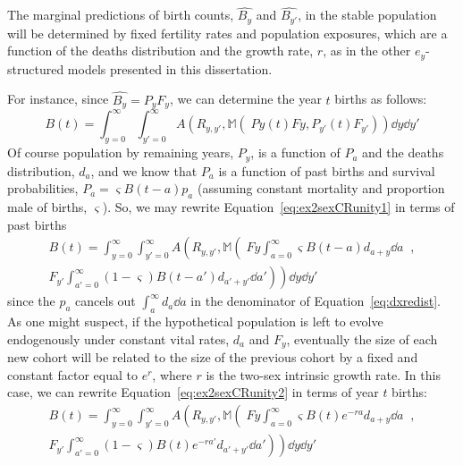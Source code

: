 The marginal predictions of birth counts, $\widehat{B_y}$ and
$\widehat{B_{y'}}$, in the stable population will be determined by
fixed fertility rates and population exposures, which are a function of the
deaths distribution and the growth rate, $r$, as in the other $e_y$-structured 
models presented in this dissertation. 

For instance, since $\widehat{B_y} = P_yF_y$, we can determine the year $t$
births as follows:
\begin{equation}
\label{eq:ex2sexCRunity1}
B(t) = \int_{y=0}^\infty \int_{y'=0}^\infty
A\left(R_{y,y'},\mathbb{M}\left(\;Py(t)Fy, P_{y'}(t)F_{y'} \right)\right) \dd y
\dd y'
\end{equation} 
Of course population by remaining years, $P_y$, is a function of $P_a$ and the
deaths distribution, $d_a$, and we know that $P_a$ is a function of past births
and survival probabilities, $P_a = \varsigma B(t-a)p_a$ (assuming constant
mortality and proportion male of births, $\varsigma$). So, we may rewrite
Equation~\eqref{eq:ex2sexCRunity1} in terms of past births
\begin{equation}
\label{eq:ex2sexCRunity2}
\begin{split}
B(t) = \int_{y=0}^\infty \int_{y'=0}^\infty
A\left(R_{y,y'},\mathbb{M}\left(\;Fy \int_{a=0}^\infty\varsigma
B(t-a)d_{a+y}\dd a\;\;,\right. \right. \\\left.
\left.F_{y'}\int_{a'=0}^\infty(1-\varsigma) B(t-a')d_{a'+y'} \dd a'\right)\right) \dd y \dd y'
\end{split}
\end{equation}
since the $p_a$ cancels out $\int _a^\infty d_a \dd a$ in the denominator of
Equation~\eqref{eq:dxredist}. As one might suspect, if the hypothetical
population is left to evolve endogenously under constant vital rates, $d_a$
and $F_y$, eventually the size of each new cohort will be related to the size
of the previous cohort by a fixed and constant factor equal to $e^r$, where
$r$ is the two-sex intrinsic growth rate. In this case, we can rewrite
Equation~\eqref{eq:ex2sexCRunity2} in terms of year $t$ births:
\begin{equation}
\label{eq:ex2sexCRunity3}
\begin{split}
B(t) = \int_{y=0}^\infty \int_{y'=0}^\infty
A\left(R_{y,y'},\mathbb{M}\left(\;Fy \int_{a=0}^\infty\varsigma
B(t)e^{-ra}d_{a+y}\dd a\right. \right.\;\;, \\ \left.
\left.F_{y'}\int_{a'=0}^\infty(1-\varsigma) B(t)e^{-ra'}d_{a'+y'} \dd a'\right)\right) \dd y \dd y'
\end{split}
\end{equation}
